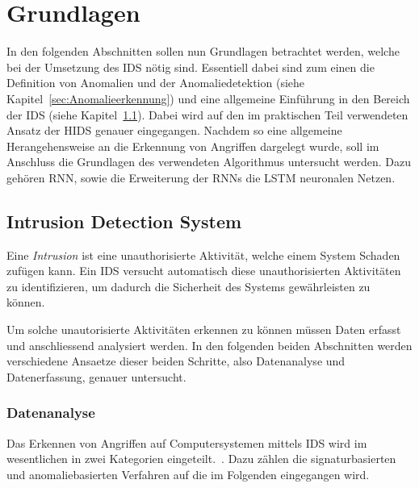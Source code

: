 
\chapter{Grundlagen}\label{ch:Grundlagen}
In den folgenden Abschnitten sollen nun Grundlagen betrachtet werden, welche bei der Umsetzung des \ac{IDS} nötig sind.
    Essentiell dabei sind zum einen die Definition von Anomalien und der Anomaliedetektion (siehe Kapitel~\ref{sec:Anomalieerkennung})
    und eine allgemeine Einführung in den Bereich der \ac{IDS} (siehe Kapitel~\ref{sec:IDS}).
    Dabei wird auf den im praktischen Teil verwendeten Ansatz der \ac{HIDS} genauer eingegangen.
    Nachdem so eine allgemeine Herangehensweise an die Erkennung von Angriffen dargelegt wurde, 
    soll im Anschluss die Grundlagen des verwendeten Algorithmus untersucht werden.
    Dazu gehören \ac{RNN}, sowie die Erweiterung der \ac{RNN}s die \ac{LSTM} neuronalen Netzen.

    \section{Intrusion Detection System}\label{sec:IDS}
        Eine \textit{Intrusion}  ist eine unauthorisierte Aktivität, welche einem System Schaden zufügen kann.
        Ein \ac{IDS} versucht automatisch diese unauthorisierten Aktivitäten zu identifizieren, um dadurch die Sicherheit des Systems gewährleisten zu können.~\cite{IDSreview}
        
        Um solche unautorisierte Aktivitäten erkennen zu können müssen Daten erfasst und anschliessend analysiert werden.
        In den folgenden beiden Abschnitten werden verschiedene Ansaetze dieser beiden Schritte, also Datenanalyse und Datenerfassung, genauer untersucht.

        \subsection{Datenanalyse}\label{sec:Datenanalyse}
        Das Erkennen von Angriffen auf Computersystemen mittels \ac{IDS} wird im wesentlichen in zwei Kategorien eingeteilt.~\cite{IDSreview, IDSsurvey, IDSsurvey2}.
            Dazu zählen die signaturbasierten und anomaliebasierten Verfahren auf die im Folgenden eingegangen wird.

